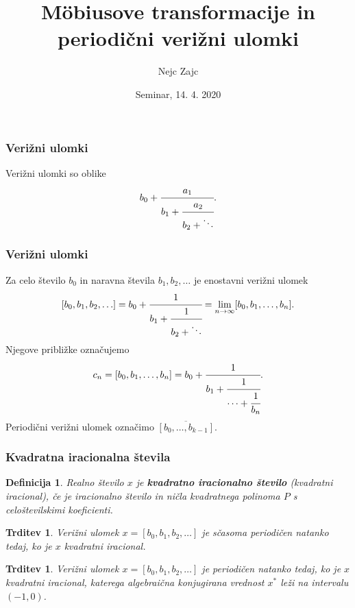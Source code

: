 \documentclass{beamer}
\title{M\"obiusove transformacije in periodični verižni ulomki}
\author[Nejc Zajc]{Nejc Zajc}
\date{Seminar, 14. 4. 2020}
\newtheorem{trditev}[theorem]{Trditev}
\newtheorem{definicija}{Definicija}
\begin{document}
\begin{frame}
\maketitle

\end{frame}

\begin{frame}
\frametitle{Verižni ulomki}
Verižni ulomki so oblike
\[
    b_0 + \cfrac{a_1}{b_1 + \cfrac{a_2}{b_2 + \ddots}}.
\]  

\end{frame}
\begin{frame}
\frametitle{Verižni ulomki}
Za celo število $b_0$ in naravna števila $b_1, b_2, \ldots$ je enostavni verižni ulomek 
\[
    [b_0, b_1, b_2, \ldots] = b_0 + \cfrac{1}{b_1 + \cfrac{1}{b_2 + \ddots}} = \lim_{n \to \infty} [b_0, b_1, \ldots, b_n].
\]
Njegove približke označujemo
\[
    c_n = [b_0, b_1, \ldots, b_n] = b_0 + \cfrac{1}{b_1 + \cfrac{1}{\cdots + \cfrac{1}{b_n}}}.
\]
\pause
Periodični verižni ulomek označimo $\overline{[b_0, \ldots, b_{k-1}]}$.





\end{frame}
\begin{frame}
\frametitle{Kvadratna iracionalna števila}
\begin{definicija}
    Realno število $x$ je \textbf{kvadratno iracionalno število} (kvadratni iracional), če je iracionalno število in ničla kvadratnega polinoma $P$ s celoštevilskimi koeficienti.
\end{definicija}
\pause
\begin{trditev}
    Verižni ulomek $x = [b_0, b_1, b_2, \ldots]$ je sčasoma periodičen natanko tedaj, ko je $x$ kvadratni iracional.
\end{trditev}
\pause
\begin{trditev}
    Verižni ulomek $x = [b_0, b_1, b_2, \ldots]$ je periodičen natanko tedaj, ko je $x$ kvadratni iracional, katerega algebraična konjugirana vrednost $x^*$ leži na intervalu $(-1, 0)$.
\end{trditev} 




\end{frame}
\end{document}
